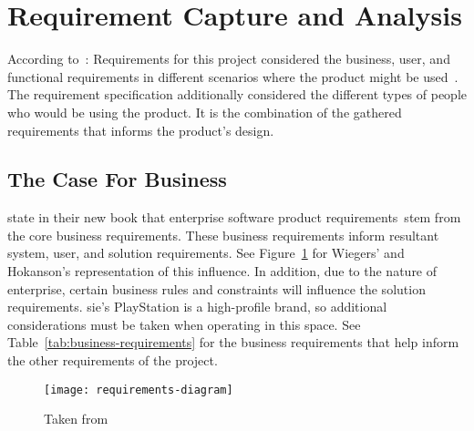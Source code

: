 \thispagestyle{plain}
\newpage
\section{Requirement Capture and Analysis}\label{sec:requirement-capture}

\normalsize

According to~\citet{anton2003successful}: 
Requirements for this project considered the business, user, and functional requirements in different scenarios where the product might be used~\citep{wiegers2000karl, potts1994inquiry}.
The requirement specification additionally considered the different types of people who would be using the product.
It is the combination of the gathered requirements that informs the product's design.

\subsection{The Case For Business}\label{subsec:the-business-case}

\citet{wiegers_hokanson_2023} state in their new book that enterprise software product requirements~\gls{stem} from the core business requirements.
These business requirements inform resultant system, user, and solution requirements.
See Figure~\ref{fig:requirements-diagram} for Wiegers' and Hokanson's representation of this influence.
In addition, due to the nature of enterprise, certain business rules and constraints will influence the solution requirements.
\gls{sie}'s PlayStation is a high-profile brand, so additional considerations must be taken when operating in this space.
See Table~\ref{tab:business-requirements} for the business requirements that help inform the other requirements of the project.

\begin{figure}[!htb]
    \minipage{\textwidth}
    \texttt{[image: requirements-diagram]}
    \caption{Taken from~\citep{wiegers_hokanson_2023}}\label{fig:requirements-diagram}
    \endminipage\hfill
\end{figure}

